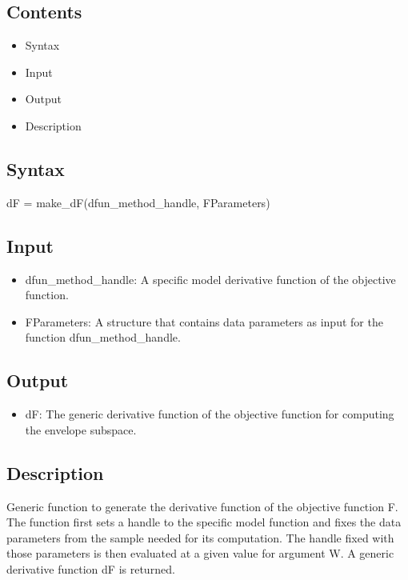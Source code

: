 \documentclass[a4paper,11pt,openany]{memoir}
\begin{document}
\subsection*{Contents}

\begin{itemize}
\setlength{\itemsep}{-1ex}
   \item Syntax
   \item Input
   \item Output
   \item Description
\end{itemize}


\subsection*{Syntax}

\begin{par}
dF = make\_dF(dfun\_method\_handle, FParameters)
\end{par} \vspace{1em}


\subsection*{Input}

\begin{itemize}
\setlength{\itemsep}{-1ex}
   \item dfun\_method\_handle: A specific model derivative function of the objective function.
   \item FParameters: A structure that contains data parameters as input for the function dfun\_method\_handle.
\end{itemize}


\subsection*{Output}

\begin{itemize}
\setlength{\itemsep}{-1ex}
   \item dF: The generic derivative function of the objective function for computing the envelope subspace.
\end{itemize}


\subsection*{Description}

\begin{par}
Generic function to generate the derivative function of the objective function F. The function first sets a handle to the specific model function and fixes the data parameters from the sample needed for its computation. The handle fixed with those parameters is then evaluated at a given value for argument W. A generic derivative function dF is returned.
\end{par} \vspace{1em}
\end{document}
